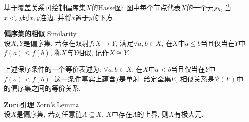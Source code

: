 \par 基于覆盖关系可绘制偏序集$X$的Hasse图: 图中每个节点代表$X$的一个元素, 当$x<_c y$时$x,y$连边, 并将$x$置于$y$的下方. 

\begin{dfn} \textbf{偏序集的相似} Similarity\\
设$X,Y$是偏序集, 若存在双射$f:X\to Y$, 满足$\forall a,b\in X$, 在$X$中$a\le b$当且仅当在$Y$中$f(a)\le f(b)$, 称$X$与$Y$相似, 记作$X\cong Y$. 
\end{dfn}
上述保序条件的一个等价表述为: $\forall a,b\in X$, 在$X$中$a<b$当且仅当在$Y$中$f(a)<f(b)$. 这一条件事实上蕴含$f$是单射. 给定全集$E$, 相似关系是$\mathcal{P}(E)$中的偏序集之间的等价关系. 

\begin{thm} \textbf{Zorn引理} Zorn's Lemma\\
设$X$是偏序集, 若对任意链$A\subseteq X$, $X$中存在$A$的上界, 则$X$有极大元. 
\end{thm}
